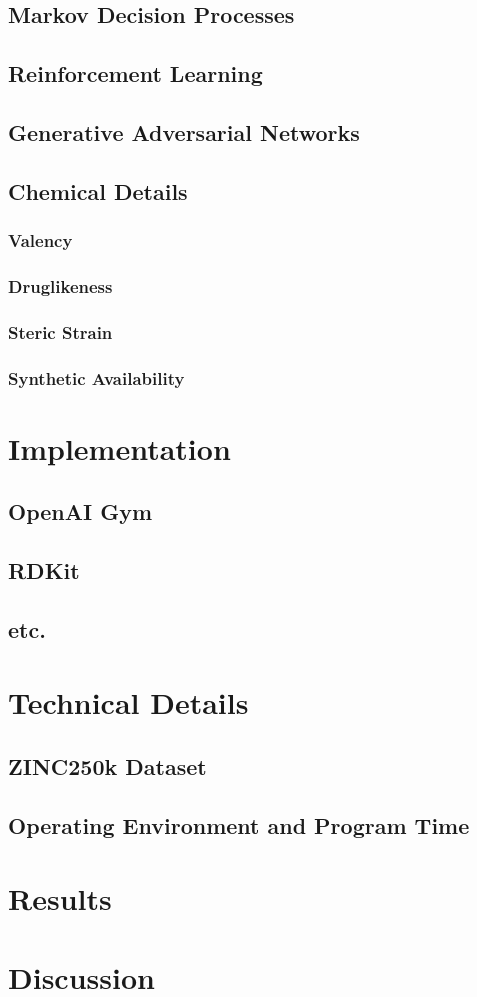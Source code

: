 \documentclass{article}
\begin{document}
\subsection{Markov Decision Processes}
\subsection{Reinforcement Learning}
\subsection{Generative Adversarial Networks}
\subsection{Chemical Details}
\subsubsection*{Valency}
\subsubsection*{Druglikeness}
\subsubsection*{Steric Strain}
\subsubsection*{Synthetic Availability}
\section{Implementation}
\subsection{OpenAI Gym}
\subsection{RDKit}
\subsection{etc.}
\section{Technical Details}
\subsection{ZINC250k Dataset}
\subsection{Operating Environment and Program Time}
\section{Results}
\section{Discussion}
\end{document}
